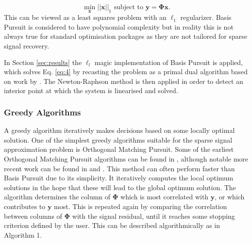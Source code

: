 \begin{equation}
  \label{eq:4}
  \min_{\boldsymbol{x}} ||\boldsymbol{x}||_1 \text{ subject to } \boldsymbol{y} = \boldsymbol{\Phi} \boldsymbol{x}.
\end{equation}
This can be viewed as a least squares problem with an $\ell_1$ regularizer. Basis Pursuit is considered to have polynomial complexity but in reality this is not always true for standard optimisation packages as they are not tailored for sparse signal recovery. 


In Section \ref{sec:results} the $\ell_l$ magic \cite{Candes2005} implementation of Basis Pursuit is applied, which solves Eq. \eqref{eq:4} by recasting the problem as a primal dual algorithm based on work by \cite{boyd2004convex}. The Newton-Raphson method is then applied in order to detect an interior point at which the system is linearised and solved. 
\subsubsection{Greedy Algorithms}
\label{sec:greedy-algorithm}
A greedy algorithm iteratively makes decisions based on some locally optimal solution. One of the simplest greedy algorithms suitable for the sparse signal approximation problem is Orthogonal Matching Pursuit. Some of the earliest Orthogonal Matching Pursuit algorithms can be found in \cite{pati1993, davis1997}, although notable more recent work can be found in  \cite{tropp2004} and \cite{tropp2007}. This method can often perform faster than Basis Pursuit due to its simplicity. It iteratively computes the local optimum solutions in the hope that these will lead to the global optimum solution. The algorithm determines the column of $\boldsymbol{\Phi}$ which is most correlated with $\boldsymbol{y}$, or which contributes to $\boldsymbol{y}$ most. This is repeated again by comparing the correlation between columns of $\boldsymbol{\Phi}$ with the signal residual, until it reaches some stopping criterion defined by the user.  This can be described algorithmically as in Algorithm 1.  

